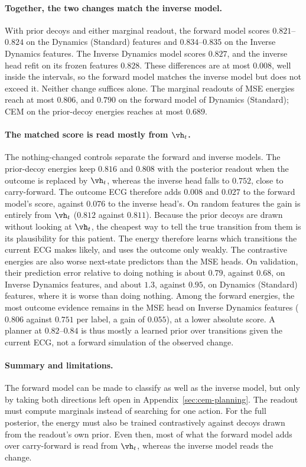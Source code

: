 \paragraph{Together, the two changes match the inverse model.} With prior decoys and either marginal readout, the forward model scores $0.821$--$0.824$ on the Dynamics (Standard) features and $0.834$--$0.835$ on the Inverse Dynamics features. The Inverse Dynamics model scores $0.827$, and the inverse head refit on its frozen features $0.828$. These differences are at most $0.008$, well inside the intervals, so the forward model matches the inverse model but does not exceed it. Neither change suffices alone. The marginal readouts of MSE energies reach at most $0.806$, and $0.790$ on the forward model of Dynamics (Standard); CEM on the prior-decoy energies reaches at most $0.689$.

\paragraph{The matched score is read mostly from $\vh_t$.} The nothing-changed controls separate the forward and inverse models. The prior-decoy energies keep $0.816$ and $0.808$ with the posterior readout when the outcome is replaced by $\vh_t$, whereas the inverse head falls to $0.752$, close to carry-forward. The outcome ECG therefore adds $0.008$ and $0.027$ to the forward model's score, against $0.076$ to the inverse head's. On random features the gain is entirely from $\vh_t$ ($0.812$ against $0.811$). Because the prior decoys are drawn without looking at $\vh_t$, the cheapest way to tell the true transition from them is its plausibility for this patient. The energy therefore learns which transitions the current ECG makes likely, and uses the outcome only weakly. The contrastive energies are also worse next-state predictors than the MSE heads. On validation, their prediction error relative to doing nothing is about $0.79$, against $0.68$, on Inverse Dynamics features, and about $1.3$, against $0.95$, on Dynamics (Standard) features, where it is worse than doing nothing. Among the forward energies, the most outcome evidence remains in the MSE head on Inverse Dynamics features ($0.806$ against $0.751$ per label, a gain of $0.055$), at a lower absolute score. A planner at $0.82$--$0.84$ is thus mostly a learned prior over transitions given the current ECG, not a forward simulation of the observed change.

\paragraph{Summary and limitations.} The forward model can be made to classify as well as the inverse model, but only by taking both directions left open in Appendix~\ref{sec:cem-planning}. The readout must compute marginals instead of searching for one action. For the full posterior, the energy must also be trained contrastively against decoys drawn from the readout's own prior. Even then, most of what the forward model adds over carry-forward is read from $\vh_t$, whereas the inverse model reads the change.

